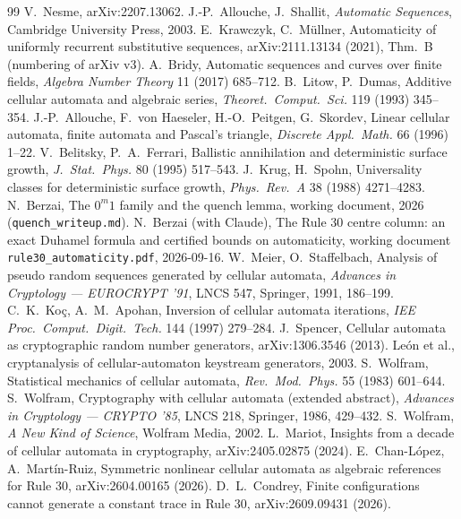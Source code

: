 \documentclass[11pt]{article}
\theoremstyle{definition}
\theoremstyle{remark}
\begin{document}
\begin{thebibliography}{99}
 V.~Nesme, arXiv:2207.13062.
 J.-P.~Allouche, J.~Shallit, \emph{Automatic Sequences}, Cambridge University Press, 2003.
 E.~Krawczyk, C.~M\"ullner, Automaticity of uniformly recurrent substitutive sequences, arXiv:2111.13134 (2021), Thm.~B (numbering of arXiv v3).
 A.~Bridy, Automatic sequences and curves over finite fields, \emph{Algebra Number Theory} 11 (2017) 685--712.
 B.~Litow, P.~Dumas, Additive cellular automata and algebraic series, \emph{Theoret.\ Comput.\ Sci.} 119 (1993) 345--354.
 J.-P.~Allouche, F.~von Haeseler, H.-O.~Peitgen, G.~Skordev, Linear cellular automata, finite automata and Pascal's triangle, \emph{Discrete Appl.\ Math.} 66 (1996) 1--22.
 V.~Belitsky, P.~A.~Ferrari, Ballistic annihilation and deterministic surface growth, \emph{J.~Stat.~Phys.} 80 (1995) 517--543.
 J.~Krug, H.~Spohn, Universality classes for deterministic surface growth, \emph{Phys.\ Rev.\ A} 38 (1988) 4271--4283.
 N.~Berzai, The $0^m1$ family and the quench lemma, working document, 2026 (\texttt{quench\_writeup.md}).
 N.~Berzai (with Claude), The Rule 30 centre column: an exact Duhamel formula and certified bounds on automaticity, working document \texttt{rule30\_automaticity.pdf}, 2026-09-16.
 W.~Meier, O.~Staffelbach, Analysis of pseudo random sequences generated by cellular automata, \emph{Advances in Cryptology --- EUROCRYPT '91}, LNCS 547, Springer, 1991, 186--199.
 C.~K.~Ko\c{c}, A.~M.~Apohan, Inversion of cellular automata iterations, \emph{IEE Proc.\ Comput.\ Digit.\ Tech.} 144 (1997) 279--284.
 J.~Spencer, Cellular automata as cryptographic random number generators, arXiv:1306.3546 (2013).
 Le\'on et al., cryptanalysis of cellular-automaton keystream generators, 2003.
 S.~Wolfram, Statistical mechanics of cellular automata, \emph{Rev.\ Mod.\ Phys.} 55 (1983) 601--644.
 S.~Wolfram, Cryptography with cellular automata (extended abstract), \emph{Advances in Cryptology --- CRYPTO '85}, LNCS 218, Springer, 1986, 429--432.
 S.~Wolfram, \emph{A New Kind of Science}, Wolfram Media, 2002.
 L.~Mariot, Insights from a decade of cellular automata in cryptography, arXiv:2405.02875 (2024).
 E.~Chan-L\'opez, A.~Mart\'in-Ruiz, Symmetric nonlinear cellular automata as algebraic references for Rule 30, arXiv:2604.00165 (2026).
 D.~L.~Condrey, Finite configurations cannot generate a constant trace in Rule 30, arXiv:2609.09431 (2026).

\end{thebibliography}
\end{document}
